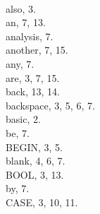 \inx
\:\\{also}, 3.
\:\\{an}, 7, 13.
\:\\{analysis}, 7.
\:\\{another}, 7, 15.
\:\\{any}, 7.
\:\\{are}, 3, 7, 15.
\:\\{back}, 13, 14.
\:\\{backspace}, 3, 5, 6, 7.
\:\\{basic}, 2.
\:\\{be}, 7.
\:\\{BEGIN}, 3, 5.
\:\\{blank}, 4, 6, 7.
\:\\{BOOL}, 3, 13.
\:\\{by}, 7.
\:\\{CASE}, 3, 10, 11.
